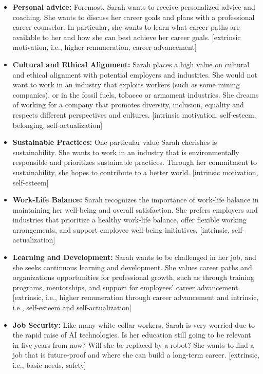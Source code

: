 \begin{itemize}
    \item \textbf{Personal advice:}
        Foremost, Sarah wants to receive personalized advice and coaching. She wants to discuss her career goals and plans with a
        professional career counselor. In particular, she wants to learn what career paths are available to her and how she can best
        achieve her career goals. [extrinsic motivation, i.e., higher remuneration, career advancement]
    \item \textbf{Cultural and Ethical Alignment:}
        Sarah places a high value on cultural and ethical alignment with potential employers and industries. She would not want to work 
        in an industry that exploits workers (such as some mining companies), or in the fossil fuels, tobacco or armament industries. She
        dreams of working for a company that promotes diversity, inclusion, equality and respects different perspectives and cultures.
        [intrinsic motivation, self-esteem, belonging, self-actualization]
    \item \textbf{Sustainable Practices:} 
        One particular value Sarah cherishes is sustainability. She wants to work in an industry that is environmentally responsible and
        prioritizes sustainable practices. Through her commitment to sustainability, she hopes to contribute to a better world. [intrinsic
        motivation, self-esteem]
        \item \textbf{Work-Life Balance:}
        Sarah recognizes the importance of work-life balance in maintaining her well-being and overall satisfaction. She prefers
        employers and industries that prioritize a healthy work-life balance, offer flexible working arrangements, and support
        employee well-being initiatives. [intrinsic, self-actualization]
    \item \textbf{Learning and Development:}
        Sarah wants to be challenged in her job, and she seeks continuous learning and development. She values career paths and organizations
        opportunities for professional growth, such as through training programs, mentorships, and support for employees' career advancement.
        [extrinsic, i.e., higher remuneration through career advancement and intrinsic, i.e., self-esteem and self-actualization]
    \item \textbf{Job Security:}
        Like many white collar workers, Sarah is very worried due to the rapid raise of AI technologies. Is her education still going to
        be relevant in five years from now? Will she be replaced by a robot? She wants to find a job that is future-proof and where she
        can build a long-term career. [extrinsic, i.e., basic needs, safety]
\end{itemize}

